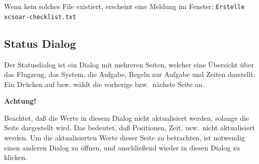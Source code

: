 Wenn kein solches File existiert, erscheint eine Meldung im Fenster: \verb|Erstelle xcsoar-checklist.txt|

\subsection*{Status Dialog}


Der Statusdialog ist ein Dialog mit mehreren Seiten, welcher eine Übersicht über das Flugzeug, das System, die Aufgabe, Regeln zur Aufgabe und Zeiten darstellt. Ein Drücken auf \button{$<$} bzw.  \button{$>$} wählt die vorherige bzw.\  nächste Seite an.

\textbf{Achtung!}

Beachtet, daß die Werte in diesem Dialog nicht aktualisiert werden, solange die Seite dargestellt wird.
\warning Das bedeutet, daß Positionen, Zeit, usw.\ nicht aktualisiert werden. Um die aktualisierten Werte dieser Seite zu betrachten, ist notwendig einen anderen Dialog zu öffnen, und anschließend wieder in diesen Dialog zu klicken.

